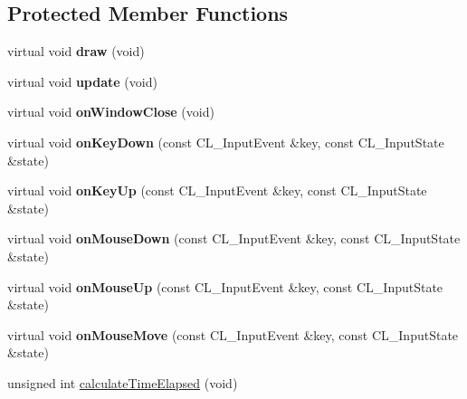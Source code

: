 \subsection*{Protected Member Functions}
\begin{DoxyCompactItemize}
\item 
\hypertarget{classApplicationModule_a8976aad9f18518a03d83be61283d9b6e}{
virtual void {\bfseries draw} (void)}
\label{classApplicationModule_a8976aad9f18518a03d83be61283d9b6e}

\item 
\hypertarget{classApplicationModule_a1bfe895c2c5f3d14e32973db2ec51723}{
virtual void {\bfseries update} (void)}
\label{classApplicationModule_a1bfe895c2c5f3d14e32973db2ec51723}

\item 
\hypertarget{classApplicationModule_a5c74fc3bc3a5352f98a960a1fd25a596}{
virtual void {\bfseries onWindowClose} (void)}
\label{classApplicationModule_a5c74fc3bc3a5352f98a960a1fd25a596}

\item 
\hypertarget{classApplicationModule_ad43a15efcd7403dd241758f972c4286b}{
virtual void {\bfseries onKeyDown} (const CL\_\-InputEvent \&key, const CL\_\-InputState \&state)}
\label{classApplicationModule_ad43a15efcd7403dd241758f972c4286b}

\item 
\hypertarget{classApplicationModule_ae7ecbae3c52055ab1074847c6bee8272}{
virtual void {\bfseries onKeyUp} (const CL\_\-InputEvent \&key, const CL\_\-InputState \&state)}
\label{classApplicationModule_ae7ecbae3c52055ab1074847c6bee8272}

\item 
\hypertarget{classApplicationModule_a3871c0b4d523750217d263af40a85d59}{
virtual void {\bfseries onMouseDown} (const CL\_\-InputEvent \&key, const CL\_\-InputState \&state)}
\label{classApplicationModule_a3871c0b4d523750217d263af40a85d59}

\item 
\hypertarget{classApplicationModule_af5012a46b5553145584aaba62a914385}{
virtual void {\bfseries onMouseUp} (const CL\_\-InputEvent \&key, const CL\_\-InputState \&state)}
\label{classApplicationModule_af5012a46b5553145584aaba62a914385}

\item 
\hypertarget{classApplicationModule_a64d800d2bdc6e31fc70a678215066916}{
virtual void {\bfseries onMouseMove} (const CL\_\-InputEvent \&key, const CL\_\-InputState \&state)}
\label{classApplicationModule_a64d800d2bdc6e31fc70a678215066916}

\item 
unsigned int \hyperlink{classApplicationModule_a5e13bdfbe083a500c653f92c8863c862}{calculateTimeElapsed} (void)
\end{DoxyCompactItemize}
